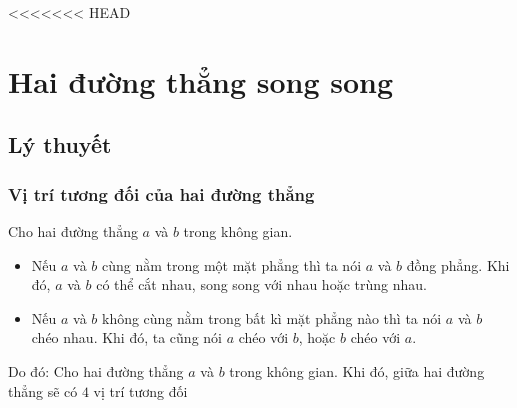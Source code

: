 <<<<<<< HEAD
\section{Hai đường thẳng song song}
\subsection{Lý thuyết}
\subsubsection{Vị trí tương đối của hai đường thẳng}
\begin{dn}
	Cho hai đường thẳng $a$ và $b$ trong không gian.
	\begin{itemize}
		\item Nếu $a$ và $b$ cùng nằm trong một mặt phẳng thì ta nói $a$ và $b$ đồng phẳng. Khi đó, $a$ và $b$ có thể cắt nhau, song song với nhau hoặc trùng nhau.
		\item Nếu $a$ và $b$ không cùng nằm trong bất kì mặt phẳng nào thì ta nói $a$ và $b$ chéo nhau. Khi đó, ta cũng nói $a$ chéo với $b$, hoặc $b$ chéo với $a$.
	\end{itemize}
\end{dn}
Do đó: Cho hai đường thẳng $a$ và $b$ trong không gian. Khi đó, giữa hai đường thẳng sẽ có $4$ vị trí tương đối
